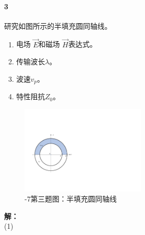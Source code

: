    \paragraph{3}研究如图所示的半填充圆同轴线。
    \begin{enumerate}
        \renewcommand*\labelenumi{(\theenumi)}
        \item 电场 $\vec{E}$和磁场 $\vec{H}$表达式。
        \item 传输波长$\lambda$。
        \item 波速$v_p$。
        \item 特性阻抗$Z_0$。
    \end{enumerate}
    \begin{figure}[htp]
        \centering
        \includegraphics[width=6cm]{figure/appendix/2-7(3).pdf}
        \caption{-7第三题图：半填充圆同轴线}\label{Fig: 2-7(3)}
    \end{figure}
    {\bfseries 解：}\\
    (1)



